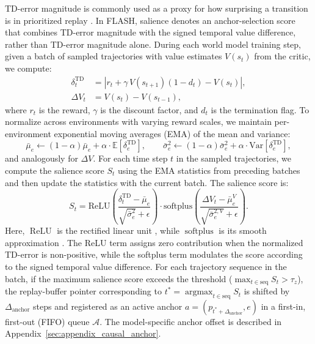 \documentclass{article} %
\begin{document}
TD-error magnitude is commonly used as a proxy for how surprising a transition is in prioritized replay \citep{schaul2015prioritized}. In FLASH, salience denotes an anchor-selection score that combines TD-error magnitude with the signed temporal value difference, rather than TD-error magnitude alone. During each world model training step, given a batch of sampled trajectories with value estimates $V(s_t)$ from the critic, we compute:
\begin{align}
\delta_t^{\text{TD}} &= \left| r_t + \gamma \, V(s_{t+1})(1 - d_t) - V(s_t) \right|, \label{eq:td_error} \\
\Delta V_t &= V(s_t) - V(s_{t-1}), \label{eq:value_diff}
\end{align}
where $r_t$ is the reward, $\gamma$ is the discount factor, and $d_t$ is the termination flag. To normalize across environments with varying reward scales, we maintain per-environment exponential moving averages (EMA) of the mean and variance:
\begin{equation}
\bar{\mu}_e \leftarrow (1-\alpha)\bar{\mu}_e + \alpha \cdot \mathbb{E}[\delta^{\text{TD}}_{e}],
\qquad 
\bar{\sigma}^2_e \leftarrow (1-\alpha)\bar{\sigma}^2_e + \alpha \cdot \text{Var}[\delta^{\text{TD}}_{e}],
\label{eq:ema_update}
\end{equation}
and analogously for $\Delta V$. For each time step $t$ in the sampled trajectories, we compute the salience score $S_t$ using the EMA statistics from preceding batches and then update the statistics with the current batch. The salience score is:
\begin{equation}
S_t = \text{ReLU}\!\left(\frac{\delta^{\text{TD}}_t - \bar{\mu}_e}{\sqrt{\bar{\sigma}^2_e} + \epsilon}\right) \cdot \text{softplus}\!\left(\frac{\Delta V_t - \bar{\mu}^{V}_e}{\sqrt{\bar{\sigma}^{2,V}_e} + \epsilon}\right).
\label{eq:salience}
\end{equation}
Here, $\operatorname{ReLU}$ is the rectified linear unit \citep{nair2010rectified}, while $\operatorname{softplus}$ is its smooth approximation \citep{dugas2000incorporating}. The ReLU term assigns zero contribution when the normalized TD-error is non-positive, while the softplus term modulates the score according to the signed temporal value difference. For each trajectory sequence in the batch, if the maximum salience score exceeds the threshold ($\max_{t \in \text{seq}} S_t > \tau_z$), the replay-buffer pointer corresponding to $t^*=\operatorname{argmax}_{t \in \text{seq}}S_t$ is shifted by $\Delta_{\text{anchor}}$ steps and registered as an active anchor $a=(p_{t^*+\Delta_{\text{anchor}}},e)$ in a first-in, first-out (FIFO) queue $\mathcal{A}$. The model-specific anchor offset is described in Appendix~\ref{sec:appendix_causal_anchor}.
\end{document}
